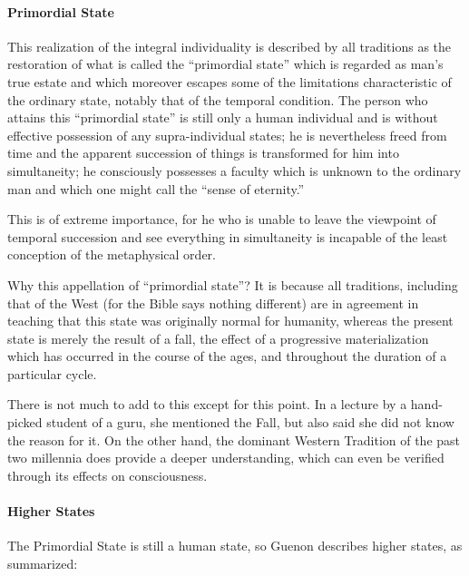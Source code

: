 \paragraph{Primordial State}
This realization of the integral individuality is described by all traditions as the restoration of what is called the “primordial state” which is regarded as man's true estate and which moreover escapes some of the limitations characteristic of the ordinary state, notably that of the temporal condition. The person who attains this “primordial state” is still only a human individual and is without effective possession of any supra-individual states; he is nevertheless freed from time and the apparent succession of things is transformed for him into simultaneity; he consciously possesses a faculty which is unknown to the ordinary man and which one might call the “sense of eternity.”

This is of extreme importance, for he who is unable to leave the viewpoint of temporal succession and see everything in simultaneity is incapable of the least conception of the metaphysical order.

\begin{quotex}
Why this appellation of “primordial state”? It is because all traditions, including that of the West (for the Bible says nothing different) are in agreement in teaching that this state was originally normal for humanity, whereas the present state is merely the result of a fall, the effect of a progressive materialization which has occurred in the course of the ages, and throughout the duration of a particular cycle. 

\end{quotex}
There is not much to add to this except for this point. In a lecture by a hand-picked student of a guru, she mentioned the Fall, but also said she did not know the reason for it. On the other hand, the dominant Western Tradition of the past two millennia does provide a deeper understanding, which can even be verified through its effects on consciousness.

\paragraph{Higher States}
The Primordial State is still a human state, so Guenon describes higher states, as summarized:

